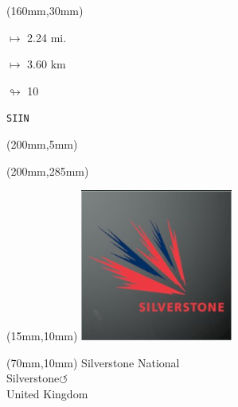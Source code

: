 \begin{textblock*}{40mm}(160mm,30mm)%
\Large
\par$\mapsto$ 2.24 mi.
\par$\mapsto$ 3.60 km
\par$\looparrowright$ 10
\par\hfill\tiny\tt SIIN\\
\end{textblock*}
\begin{textblock*}{20mm}(200mm,5mm)%
\fbox{\thepage}
\label{SIIN}
\end{textblock*}
\begin{textblock*}{20mm}(200mm,285mm)%
\fbox{\thepage}
\end{textblock*}

\null\newpage
\begin{textblock*}{50mm}(15mm,10mm)%
\includegraphics[width=50mm]{LG/2015-05-20_00094.png}
\end{textblock*}
\begin{textblock*}{130mm}(70mm,10mm)%
{\fontsize{20}{20}\selectfont Silverstone National\\}
{\fontsize{16}{16}\selectfont Silverstone\hfill \huge$\circlearrowleft$\\}
{\fontsize{12}{12}\selectfont United Kingdom\\}
\end{textblock*}
